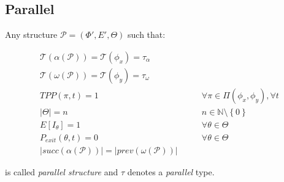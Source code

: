 \documentclass[12pt,a4paper]{report}
\newcommand{\N}{\mathbb{N}}
\begin{document}
\subsection{Parallel}

Any structure $\mathcal{P} = (\Phi',E',\Theta)$ such that:

\begin{eqnarray}
	\mathscr{T}(\alpha(\mathcal{P})) = \mathscr{T}(\phi_x) = \tau_{\alpha} \\ \mathscr{T}(\omega(\mathcal{P})) = \mathscr{T}(\phi_y) = \tau_{\omega} \\
	TPP(\pi, t) = 1 & \qquad \forall \pi \in \Pi(\phi_{x}, \phi_{y}), \forall t \\
	|\Theta| = n  & \qquad n \in \N \setminus \left\{0\right\} \\
	E[I_{\theta}] = 1 & \qquad \forall \theta \in \Theta \\
	P_{exit}(\theta, t) = 0 & \qquad \forall \theta \in \Theta \\
	|succ(\alpha(\mathcal{P}))| = |prev(\omega(\mathcal{P}))|
\end{eqnarray}

is called \textit{parallel structure} and $\tau$ denotes a \textit{parallel} type.
\end{document}
